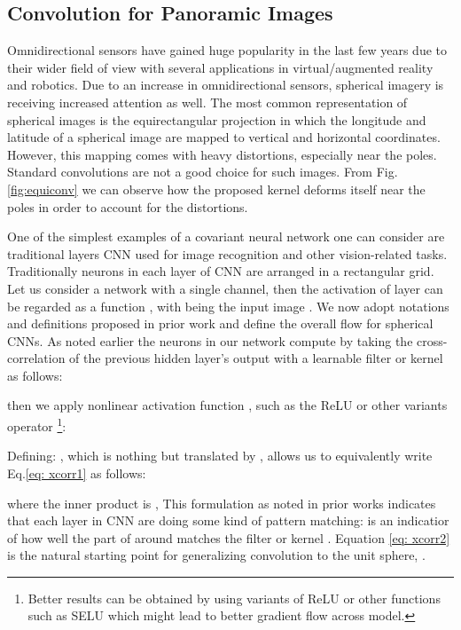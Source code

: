 \documentclass[final]{cvpr}
\begin{document}
\subsection{Convolution for Panoramic Images}
\label{subsec:sphereconv}
Omnidirectional sensors have gained huge popularity in the last few years due to their wider field of view with several applications in virtual/augmented reality and robotics. Due to an increase in omnidirectional sensors, spherical imagery is receiving increased attention as well. The most common representation of spherical images is the equirectangular projection in which the longitude and latitude of a spherical image are mapped to vertical and horizontal coordinates. However, this mapping comes with heavy distortions, especially near the poles. Standard convolutions are not a good choice for such images. From Fig. \ref{fig:equiconv} we can observe how the proposed kernel deforms itself near the poles in order to account for the distortions.





One of the simplest examples of a covariant neural network one can consider are traditional  layers CNN used for image recognition and other vision-related tasks.  
Traditionally neurons in each layer of CNN are arranged in a rectangular grid. Let us consider a network with a single channel, then the activation of layer  can be regarded as a function 
, with  being the input image \cite{cohen2018spherical,kondor2018clebschgordan}. We now adopt notations and definitions proposed in prior work \cite{kondor2018clebschgordan} and define the overall flow for spherical CNNs. 
As noted earlier the neurons in our network compute  by taking the cross-correlation
of the previous hidden layer's output  with a learnable filter or kernel  as follows:



then we apply nonlinear activation function , such as the ReLU or other variants operator \footnote{Better results can be obtained by using variants of ReLU or other functions such as SELU which might lead to better gradient flow across model.}:

\newline

Defining: , which is  
nothing but  translated by , allows us to equivalently write  Eq.\ref{eq: xcorr1} as follows:


where the inner product is ,  
This formulation as noted in prior works indicates that each layer in CNN are doing some kind of pattern matching: 
 is an indicatior of how well the part of  around  matches the filter or kernel . Equation \ref{eq: xcorr2} is the natural starting point for generalizing
convolution to the unit sphere, .
\end{document}
